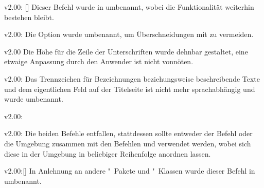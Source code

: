 \begin{Obsolete}{v2.00:}{%
  []%
}
\printobsoletelist%
%
Dieser Befehl wurde in  umbenannt, wobei die Funktionalität 
weiterhin bestehen bleibt.
\end{Obsolete}

\begin{Obsolete}{v2.00:}{}
\printobsoletelist%
%
Die Option wurde umbenannt, um Überschneidungen mit  zu 
vermeiden.
\end{Obsolete}

\begin{Obsolete}{v2.00}{}
\printobsoletelist%
%
Die Höhe für die Zeile der Unterschriften wurde dehnbar gestaltet, eine etwaige 
Anpassung durch den Anwender ist nicht vonnöten.
\end{Obsolete}

\begin{Obsolete}{v2.00:}{}%
\printobsoletelist%
%
Das Trennzeichen für Bezeichnungen beziehungsweise beschreibende Texte und dem 
eigentlichen Feld auf der Titelseite ist nicht mehr sprachabhängig und wurde 
umbenannt.
\end{Obsolete}

\begin{Obsolete}{v2.00:}{}
\begin{Obsolete}{v2.00:}{}
\printobsoletelist%
%
Die beiden Befehle entfallen, stattdessen sollte entweder der Befehl 
 oder die Umgebung  zusammen mit 
den Befehlen  und  verwendet werden, 
wobei sich diese in der Umgebung in beliebiger Reihenfolge anordnen lassen.
\end{Obsolete}
\end{Obsolete}

\begin{Obsolete}{v2.00:}{[]}
\printobsoletelist%
%
In Anlehnung an andere "~Pakete und "~Klassen wurde 
dieser Befehl in  umbenannt.
\end{Obsolete}

